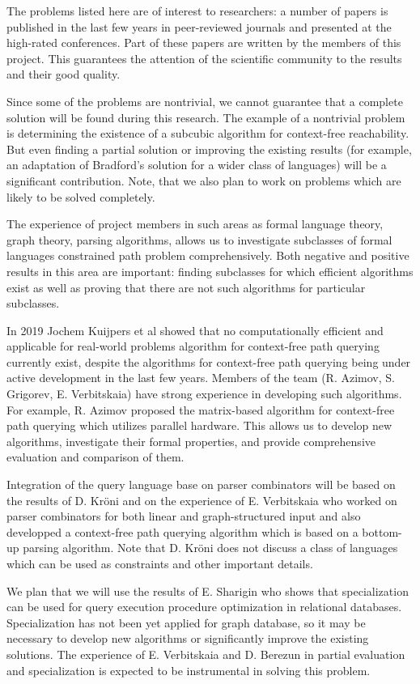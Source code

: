 \documentclass[12pt]{article}  %
\theoremstyle{remark}
\begin{document}
The problems listed here are of interest to researchers: a number of papers is published in the last few years in peer-reviewed journals and presented at the high-rated conferences.
Part of these papers are written by the members of this project.
This guarantees the attention of the scientific community to the results and their good quality.

Since some of the problems are nontrivial, we cannot  guarantee that a complete solution will be found during this research.
The example of a nontrivial problem is determining the existence of a subcubic algorithm for context-free reachability.
But even finding a partial solution or improving the existing results (for example, an adaptation of Bradford's solution for a wider class of languages) will be a significant contribution.
Note, that we also plan to work on problems which are likely to be solved completely.

The experience of project members in such areas as formal language theory, graph theory, parsing algorithms, allows us to investigate subclasses of formal languages constrained path problem comprehensively.
Both negative and positive results in this area are important:
finding subclasses for which efficient algorithms exist as well as proving that there are not such algorithms for particular subclasses.


In 2019 Jochem Kuijpers et al showed that no computationally efficient and applicable for real-world problems algorithm for context-free path querying currently exist, despite the algorithms for context-free path querying being under active development in the last few years.
Members of the team (R. Azimov, S. Grigorev, E. Verbitskaia) have strong experience in developing such algorithms.
For example, R. Azimov proposed the matrix-based algorithm for context-free path querying which utilizes parallel hardware.
This allows us to develop new algorithms, investigate their formal properties, and provide comprehensive evaluation and comparison of them.

Integration of the query language base on parser combinators will be based on the results of D. Kröni and on the experience of E. Verbitskaia who worked on parser combinators for both linear and graph-structured input and also developped a context-free path querying algorithm which is based on a bottom-up parsing algorithm.
Note that D. Kröni does not discuss a class of languages which can be used as constraints and other important details.

We plan that we will use the results of E. Sharigin who shows that specialization can be used for query execution procedure optimization in relational databases.
Specialization has not been yet applied for graph database, so it may be necessary to develop new algorithms or significantly improve the existing solutions.
The experience of E. Verbitskaia and D. Berezun in partial evaluation and specialization is expected to be instrumental in solving this problem.
\end{document}
